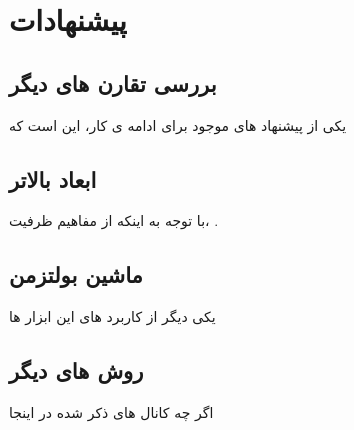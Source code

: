 \section{پیشنهادات}
\subsection{بررسی تقارن های دیگر}
یکی از پیشنهاد های موجود برای ادامه ی کار، این است که
\subsection{ابعاد بالاتر}
با توجه به اینکه از مفاهیم ظرفیت، .
\subsection{ماشین بولتزمن}
یکی دیگر از کاربرد های  این ابزار ها
\subsection{روش های دیگر}
اگر چه کانال های ذکر شده در اینجا
